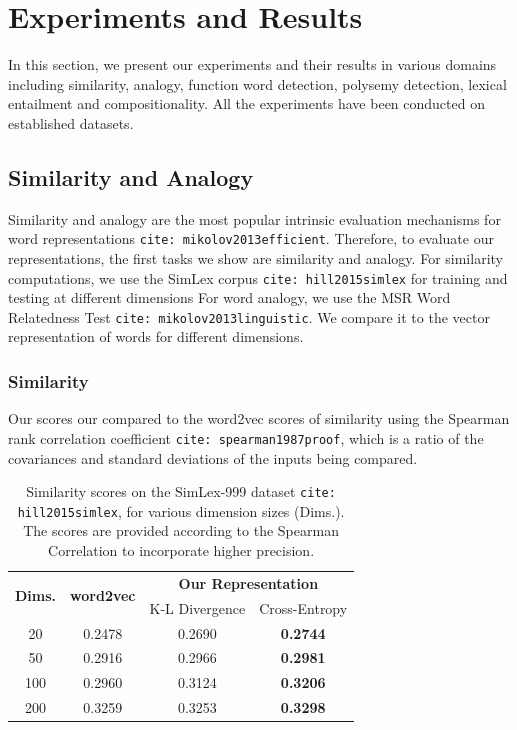\documentclass{book}
\newcommand{\citep}[1]{\texttt{cite: #1}}
\begin{document}

\section{Experiments and Results}
\label{sec: results}

In this section, we present our experiments and their results in various
domains including similarity, analogy, function word detection, polysemy
detection, lexical entailment and compositionality. All the experiments have
been conducted on established datasets.

\subsection{Similarity and Analogy}
\label{ssec: sim-anal}

Similarity and analogy are the most popular intrinsic evaluation mechanisms for
word representations \citep{mikolov2013efficient}. Therefore, to evaluate our
representations, the first tasks we show are similarity and analogy. For
similarity computations, we use the SimLex corpus \citep{hill2015simlex} for
training and testing at different dimensions For word analogy, we use the MSR
Word Relatedness Test \citep{mikolov2013linguistic}. We compare it to the
vector representation of words for different dimensions.

\subsubsection{Similarity} 

Our scores our compared to the word2vec scores of similarity using the Spearman
rank correlation coefficient \citep{spearman1987proof}, which is a ratio of the
covariances and standard deviations of the inputs being compared. 

\begin{table}[]
    \centering
    {\small
    \begin{tabular}{c|c|cc}
        \multirow{2}{*}{\bf Dims.}   & \multirow{2}{*}{\bf word2vec} & \multicolumn{2}{c}{\bf Our Representation} \\ \cline{3-4}
                            &                               & K-L Divergence & Cross-Entropy \\\hline
        20  &   0.2478   & 0.2690 & \bf 0.2744    \\
        50  &   0.2916   & 0.2966 & \bf 0.2981    \\
        100 &   0.2960   & 0.3124 & \bf 0.3206    \\
        200 &   0.3259   & 0.3253 & \bf 0.3298    
    \end{tabular}
    }
    \caption{Similarity scores on the SimLex-999 dataset \citep{hill2015simlex}, for various dimension sizes (Dims.). The scores are provided according to the Spearman Correlation to incorporate higher precision.}
    \label{tab: similarity scores}
\end{table}
\end{document}
